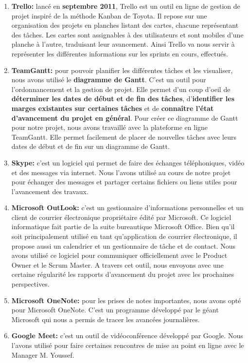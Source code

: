         \begin{enumerate}
            \item \textbf{Trello: }lancé en \textbf{septembre 2011}, Trello est un outil en ligne de gestion de projet inspiré de la méthode Kanban de Toyota. Il repose sur une organisation des projets en planches listant des cartes, chacune représentant des tâches. Les cartes sont assignables à des utilisateurs et sont mobiles d'une planche à l'autre, traduisant leur avancement. Ainsi Trello va nous servir à représenter les différentes informations sur les sprints en cours, effectués.
            \item \textbf{TeamGantt: } pour pouvoir planifier les différentes tâches et les visualiser, nous avons utilisé le \textbf{diagramme de Gantt}. C'est un outil pour l'ordonnancement et la gestion de projet. Elle permet d'un coup d'oeil de \textbf{déterminer les dates de début et de fin des tâches}, d'\textbf{identifier les marges existantes sur certaines tâches} et de \textbf{connaître l'état d'avancement du projet en général}. Pour créer ce diagramme de Gantt pour notre projet, nous avons travaillé avec la plateforme en ligne TeamGantt. Elle permet facilement de placer de nouvelles tâches avec leurs dates de début et de fin sur un diagramme de Gantt.
            \item \textbf{Skype: }c'est un logiciel qui permet de faire des échanges téléphoniques, vidéo et des messages via internet. Nous l'avons utilisé au cours de notre projet pour échanger des messages et partager certains fichiers ou liens utiles pour l'avancement des travaux.
            \item \textbf{Microsoft OutLook: }c'est un gestionnaire d'informations personnelles et un client de courrier électronique propriétaire édité par Microsoft. Ce logiciel informatique fait partie de la suite bureautique Microsoft Office. Bien qu'il soit principalement utilisé en tant qu'application de courrier électronique, il propose aussi un calendrier et un gestionnaire de tâche et de contact. Nous avons utilisé ce logiciel pour communiquer officiellement avec le Product Owner et le Scrum Master. A travers cet outil, nous envoyons avec une certaine régularité les rapports d'avancement du projet avec les prochaines perspectives.
            \item \textbf{Microsoft OneNote: }pour les prises de notes importantes, nous avons opté pour Microsoft OneNote. C'est un programme développé par le géant Microsoft qui nous a permis de tracer les avancées journalières.
            \item \textbf{Google Meet: } c'est un outil de vidéoconférence développé par Google. Nous l'avons utilisé pour faire certaines rencontres de mise au point en ligne avec le Manager M. Youssef. 
        \end{enumerate}

